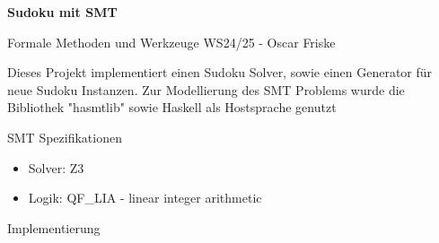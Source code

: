 





\begin{Large}
    \textsf{\textbf{Sudoku mit SMT}}

    Formale Methoden und Werkzeuge WS24/25 - Oscar Friske
\end{Large}
\vspace{2ex}

Dieses Projekt implementiert einen Sudoku Solver, sowie einen Generator für neue Sudoku Instanzen. Zur Modellierung des SMT Problems wurde die Bibliothek "hasmtlib" sowie Haskell als Hostsprache genutzt

\vspace{2ex}

\begin{Large}
    SMT Spezifikationen
\end{Large}
\begin{itemize}
  \item Solver: Z3
  \item Logik: QF\_LIA - linear integer arithmetic
\end{itemize}
\vspace{2ex}

\begin{Large}
    Implementierung
\end{Large}
\vspace{2ex}

